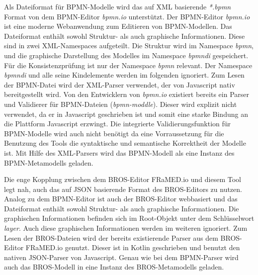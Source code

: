 Als Dateiformat für BPMN-Modelle wird das auf XML basierende \emph{*.bpmn} Format von dem BPMN-Editor \emph{bpmn.io} unterstützt.
Der BPMN-Editor \emph{bpmn.io} ist eine moderne Webanwendung zum Editieren von BPMN-Modellen.
Das Dateiformat enthält sowohl Struktur- als auch graphische Informationen.
Diese sind in zwei XML-Namespaces aufgeteilt.
Die Struktur wird im Namespace \emph{bpmn}, und die graphische Darstellung des Modelles im Namespace \emph{bpmndi} gespeichert.
Für die Konsistenzprüfung ist nur der Namespace \emph{bpmn} relevant.
Der Namespace \emph{bpmndi} und alle seine Kindelemente werden im folgenden ignoriert.
Zum Lesen der BPMN-Datei wird der XML-Parser verwendet, der von Javascript nativ bereitgestellt wird.
Von den Entwicklern von \emph{bpmn.io} existiert bereits ein Parser und Validierer für BPMN-Dateien (\emph{bpmn-moddle}).
Dieser wird explizit nicht verwendet, da er in Javascript geschrieben ist und somit eine starke Bindung an die Plattform Javascript erzwingt.
Die integrierte Validierungsfunktion für BPMN-Modelle wird auch nicht benötigt da eine Vorraussetzung für die Benutzung des Tools die syntaktische und semantische Korrektheit der Modelle ist. 
Mit Hilfe des XML-Parsers wird das BPMN-Modell als eine Instanz des BPMN-Metamodells geladen.

Die enge Kopplung zwischen dem BROS-Editor FRaMED.io und diesem Tool legt nah, auch das auf JSON basierende Format des BROS-Editors zu nutzen.
Analog zu dem BPMN-Editor ist auch der BROS-Editor webbasiert und das Dateiformat enthält sowohl Struktur- als auch graphische Informationen.
Die graphischen Informationen befinden sich im Root-Objekt unter dem Schlüsselwort \emph{layer}.
Auch diese graphischen Informationen werden im weiteren ignoriert.
Zum Lesen der BROS-Dateien wird der bereits existierende Parser aus dem BROS-Editor FRaMED.io genutzt.
Dieser ist in Kotlin geschrieben und benutzt den nativen JSON-Parser von Javascript.
Genau wie bei dem BPMN-Parser wird auch das BROS-Modell in eine Instanz des BROS-Metamodells geladen.

